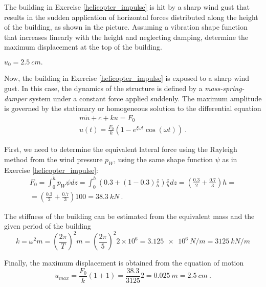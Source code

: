 
\begin{Exercise}[label={wind_gust_impulse}]
The building in Exercise \ref{helicopter_impulse} is hit by a sharp wind gust that results in the sudden application of horizontal forces distributed along the height of the building, as shown in the picture. Assuming a vibration shape function that increases linearly with the height and neglecting damping, determine the maximum displacement at the top of the building.

\begin{center}
\end{center}

\shortAnswer $u_0 = \SI{2.5}{cm}.$
\end{Exercise}



\begin{Answer}[ref={wind_gust_impulse}]
Now, the building in Exercise \ref{helicopter_impulse} is exposed to a sharp wind gust. In this case, the dynamics of the structure is defined by a \emph{mass-spring-damper} system under a constant force applied suddenly. The maximum amplitude is governed by the stationary or homogeneous solution to the differential equation
\begin{align*}
m\ddot{u} + c + ku = F_0 \\
u(t) = \frac{F_0}{k}(1 -e^{\xi\omega t}\cos(\omega t))\ .
\end{align*}

First, we need to determine the equivalent lateral force using the Rayleigh method from the wind pressure $p_W$, using the same shape function $\psi$ as in Exercise \ref{helicopter_impulse}:
\begin{align*}
F_0 = \int_0^h p_W\psi dz = \int_0^h \left(0.3 + (1-0.3)\frac{z}{h}\right)\frac{z}{h}dz = \left(\frac{0.3}{2} + \frac{0.7}{3}\right)h = \\
= \left(\frac{0.3}{2} + \frac{0.7}{3}\right)100 = \SI{38.3}{kN}\ .
\end{align*}

The stiffness of the building can be estimated from the equivalent mass and the given period of the building
$$
k = \omega^2m = \left(\frac{2\pi}{T}\right)^2m = \left(\frac{2\pi}{5}\right)^2 2\times 10^6 = \SI{3.125e6}{N/m} = \SI{3125}{kN/m}
$$

Finally, the maximum displacement is obtained from the equation of motion
$$
u_{max} = \frac{F_0}{k}(1+1) = \frac{38.3}{3125}2 = \SI{0.025}{m} = \SI{2.5}{cm}\ .
$$
\end{Answer}

